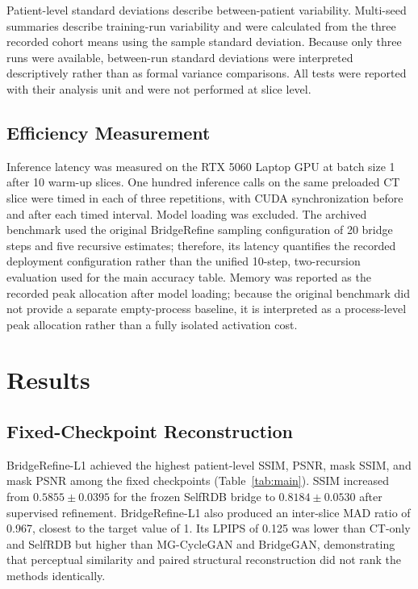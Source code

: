 Patient-level standard deviations describe between-patient variability. Multi-seed summaries describe training-run variability and were calculated from the three recorded cohort means using the sample standard deviation. Because only three runs were available, between-run standard deviations were interpreted descriptively rather than as formal variance comparisons. All tests were reported with their analysis unit and were not performed at slice level.

\subsection{Efficiency Measurement}

Inference latency was measured on the RTX 5060 Laptop GPU at batch size 1 after 10 warm-up slices. One hundred inference calls on the same preloaded CT slice were timed in each of three repetitions, with CUDA synchronization before and after each timed interval. Model loading was excluded. The archived benchmark used the original BridgeRefine sampling configuration of 20 bridge steps and five recursive estimates; therefore, its latency quantifies the recorded deployment configuration rather than the unified 10-step, two-recursion evaluation used for the main accuracy table. Memory was reported as the recorded peak allocation after model loading; because the original benchmark did not provide a separate empty-process baseline, it is interpreted as a process-level peak allocation rather than a fully isolated activation cost.

\section{Results}

\subsection{Fixed-Checkpoint Reconstruction}

BridgeRefine-L1 achieved the highest patient-level SSIM, PSNR, mask SSIM, and mask PSNR among the fixed checkpoints (Table~\ref{tab:main}). SSIM increased from $0.5855\pm0.0395$ for the frozen SelfRDB bridge to $0.8184\pm0.0530$ after supervised refinement. BridgeRefine-L1 also produced an inter-slice MAD ratio of 0.967, closest to the target value of 1. Its LPIPS of 0.125 was lower than CT-only and SelfRDB but higher than MG-CycleGAN and BridgeGAN, demonstrating that perceptual similarity and paired structural reconstruction did not rank the methods identically.

